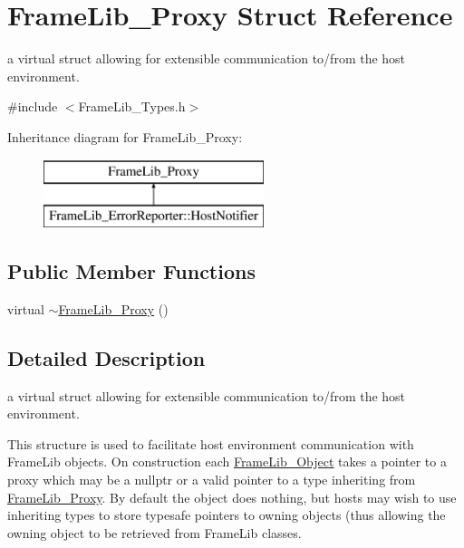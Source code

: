 \hypertarget{struct_frame_lib___proxy}{}\section{Frame\+Lib\+\_\+\+Proxy Struct Reference}
\label{struct_frame_lib___proxy}


a virtual struct allowing for extensible communication to/from the host environment.  




{\ttfamily \#include $<$Frame\+Lib\+\_\+\+Types.\+h$>$}

Inheritance diagram for Frame\+Lib\+\_\+\+Proxy\+:\begin{figure}[H]
\begin{center}
\leavevmode
\includegraphics[height=2.000000cm]{struct_frame_lib___proxy}
\end{center}
\end{figure}
\subsection*{Public Member Functions}
\begin{DoxyCompactItemize}
\item 
virtual \hyperlink{struct_frame_lib___proxy_a1c334d129eba0aaccb23e286e742771f}{$\sim$\+Frame\+Lib\+\_\+\+Proxy} ()
\end{DoxyCompactItemize}


\subsection{Detailed Description}
a virtual struct allowing for extensible communication to/from the host environment. 

This structure is used to facilitate host environment communication with Frame\+Lib objects. On construction each \hyperlink{class_frame_lib___object}{Frame\+Lib\+\_\+\+Object} takes a pointer to a proxy which may be a nullptr or a valid pointer to a type inheriting from \hyperlink{struct_frame_lib___proxy}{Frame\+Lib\+\_\+\+Proxy}. By default the object does nothing, but hosts may wish to use inheriting types to store typesafe pointers to owning objects (thus allowing the owning object to be retrieved from Frame\+Lib classes.

